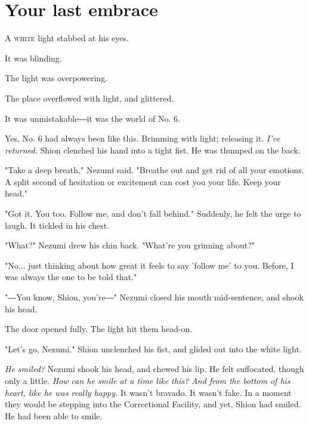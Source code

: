 
\chapter{Your last embrace}


\lettrine{A}{ white} light stabbed at his eyes.

It was blinding.

The light was overpowering.

The place overflowed with light, and glittered.

It was unmistakable―it was the world of No. 6.

\myspace

Yes, No. 6 had always been like this. Brimming with light; releasing it.
\emph{I've returned.} Shion clenched his hand into a tight fist. He was thumped
on the back.

"Take a deep breath," Nezumi said. "Breathe out and get rid of all your
emotions. A split second of hesitation or excitement can cost you your
life. Keep your head."

"Got it. You too. Follow me, and don't fall behind." Suddenly, he felt
the urge to laugh. It tickled in his chest.

"What?" Nezumi drew his chin back. "What're you grinning about?"

"No... just thinking about how great it feels to say 'follow me' to you.
Before, I was always the one to be told that."

"―You know, Shion, you're―" Nezumi closed his mouth mid-sentence, and
shook his head.

The door opened fully. The light hit them head-on.

"Let's go, Nezumi." Shion unclenched his fist, and glided out into the
white light.

\myspace

\emph{He smiled?} Nezumi shook his head, and chewed his lip. He felt
suffocated, though only a little. \emph{How can he smile at a time like this?
	And from the bottom of his heart, like he was really happy.} It wasn't
bravado. It wasn't fake. In a moment they would be stepping into the
Correctional Facility, and yet, Shion had smiled. He had been able to
smile.

